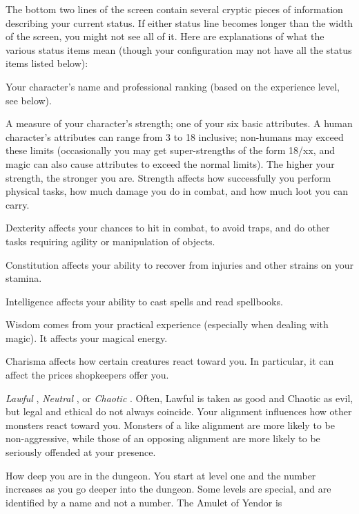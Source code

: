The bottom two lines of the screen contain several cryptic pieces of
information describing your current status.  If either status line
becomes longer than the width of the screen, you might not see all of
it.  Here are explanations of what the various status items mean
(though your configuration may not have all the status items listed
below):
\blist{}
\item[\bb{``Rank  ''}]
Your character's name and professional ranking (based on the
experience level, see below).
\item[\bb{Strength}]
A measure of your character's strength; one of your six basic
attributes.  A human character's attributes can range from 3 to 18 inclusive;
non-humans may exceed these limits
(occasionally you may get super-strengths of the form 18/xx, and magic can
also cause attributes to exceed the normal limits).  The
higher your strength, the stronger you are.  Strength affects how
successfully you perform physical tasks, how much damage you do in
combat, and how much loot you can carry.
\item[\bb{Dexterity}]
Dexterity affects your chances to hit in combat, to avoid traps, and
do other tasks requiring agility or manipulation of objects.
\item[\bb{Constitution}]
Constitution affects your ability to recover from injuries and other
strains on your stamina.
\item[\bb{Intelligence}]
Intelligence affects your ability to cast spells and read spellbooks.
\item[\bb{Wisdom}]
Wisdom comes from your practical experience (especially when dealing with
magic).  It affects your magical energy.
\item[\bb{Charisma}]
Charisma affects how certain creatures react toward you.  In
particular, it can affect the prices shopkeepers offer you.
\item[\bb{Alignment}]
%
{\it  Lawful}%
, %
{\it  Neutral}%
, or %
{\it  Chaotic}%
.  Often, Lawful is
taken as good and Chaotic as evil, but legal and ethical do not always
coincide.  Your alignment influences how other
monsters react toward you.  Monsters of a like alignment are more likely
to be non-aggressive, while those of an opposing alignment are more likely
to be seriously offended at your presence.
\item[\bb{Dungeon Level}]
How deep you are in the dungeon.  You start at level one and the number
increases as you go deeper into the dungeon.  Some levels are special,
and are identified by a name and not a number.  The Amulet of Yendor is
